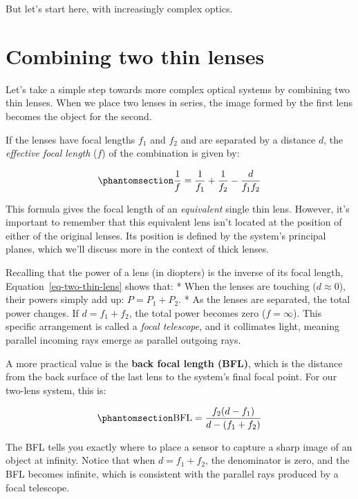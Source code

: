 \documentclass[
  letterpaper,
]{book}
\begin{document}
But let's start here, with increasingly complex optics.

\section{Combining two thin lenses}\label{combining-two-thin-lenses}

Let's take a simple step towards more complex optical systems by
combining two thin lenses. When we place two lenses in series, the image
formed by the first lens becomes the object for the second.

If the lenses have focal lengths \(f_1\) and \(f_2\) and are separated
by a distance \(d\), the \emph{effective focal length} (\(f\)) of the
combination is given by:

\begin{equation}\phantomsection\label{eq-two-thin-lens}{
\frac{1}{f} = \frac{1}{f_1} + \frac{1}{f_2} - \frac{d}{f_1 f_2}
}\end{equation}

This formula gives the focal length of an \emph{equivalent} single thin
lens. However, it's important to remember that this equivalent lens
isn't located at the position of either of the original lenses. Its
position is defined by the system's principal planes, which we'll
discuss more in the context of thick lenses.

Recalling that the power of a lens (in diopters) is the inverse of its
focal length, Equation~\ref{eq-two-thin-lens} shows that: * When the
lenses are touching (\(d \approx 0\)), their powers simply add up:
\(P = P_1 + P_2\). * As the lenses are separated, the total power
changes. If \(d = f_1 + f_2\), the total power becomes zero
(\(f = \infty\)). This specific arrangement is called a \emph{focal
telescope}, and it collimates light, meaning parallel incoming rays
emerge as parallel outgoing rays.

A more practical value is the \textbf{back focal length (BFL)}, which is
the distance from the back surface of the last lens to the system's
final focal point. For our two-lens system, this is:

\begin{equation}\phantomsection\label{eq-back-focal-length}{
\text{BFL} = \frac{f_2 (d - f_1 )}{d - (f_1 + f_2)}
}\end{equation}

The BFL tells you exactly where to place a sensor to capture a sharp
image of an object at infinity. Notice that when \(d = f_1 + f_2\), the
denominator is zero, and the BFL becomes infinite, which is consistent
with the parallel rays produced by a focal telescope.
\end{document}
